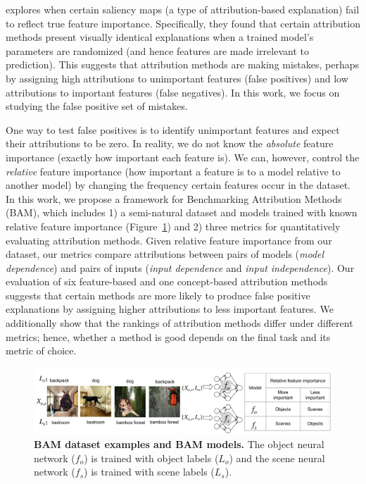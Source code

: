 \documentclass[twoside]{article}
\begin{document}
\citet{Adebayo18} explores when certain saliency maps (a type of attribution-based explanation) fail to reflect true feature importance. Specifically, they found that certain attribution methods present visually identical explanations when a trained model's parameters are randomized (and hence features are made irrelevant to prediction). This suggests that attribution methods are making mistakes, perhaps by assigning high attributions to unimportant features (false positives) and low attributions to important features (false negatives). In this work, we focus on studying the false positive set of mistakes.

One way to test false positives is to identify unimportant features and expect their attributions to be zero. In reality, we do not know the \textit{absolute} feature importance (exactly how important each feature is). We can, however, control the \textit{relative} feature importance (how important a feature is to a model relative to another model) by changing the frequency certain features occur in the dataset. In this work, we propose a framework for Benchmarking Attribution Methods (BAM), which includes 1) a semi-natural dataset and models trained with known relative feature importance (Figure~\ref{fig:dataset_demo}) and 2) three metrics for quantitatively evaluating attribution methods. Given relative feature importance from our dataset, our metrics compare attributions between pairs of models (\textit{model dependence}) and pairs of inputs (\textit{input dependence} and \textit{input independence}). Our evaluation of six feature-based and one concept-based attribution methods suggests that certain methods are more likely to produce false positive explanations by assigning higher attributions to less important features. We additionally show that the rankings of attribution methods differ under different metrics; hence, whether a method is good depends on the final task and its metric of choice.

\begin{figure}[ht]
  \centering
  \includegraphics[width=1.\linewidth]{figures/dataset_demo2.jpg}
  \caption{\textbf{BAM dataset examples and BAM models.} The object neural network ($f_o$) is trained with object labels ($L_o$) and the scene neural network ($f_s$) is trained with scene labels ($L_s$).}
  \label{fig:dataset_demo}
\end{figure}
\end{document}
